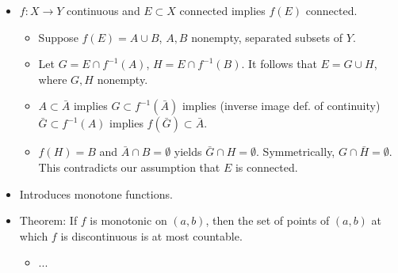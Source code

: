 \documentclass[../../notes.tex]{subfiles}
\begin{document}
\begin{itemize}
\begin{itemize}
        \item ...
    \end{itemize}
    \item {}$f:X\to Y$ continuous and $E\subset X$ connected implies $f(E)$ connected.
    \begin{itemize}
        \item Suppose $f(E)=A\cup B$, $A,B$ nonempty, separated subsets of $Y$.
        \item Let $G=E\cap f^{-1}(A)$, $H=E\cap f^{-1}(B)$. It follows that $E=G\cup H$, where $G,H$ nonempty.
        \item $A\subset\bar{A}$ implies $G\subset f^{-1}(\bar{A})$ implies (inverse image def. of continuity) $\bar{G}\subset f^{-1}(A)$ implies $f(\bar{G})\subset \bar{A}$.
        \item $f(H)=B$ and $\bar{A}\cap B=\emptyset$ yields $\bar{G}\cap H=\emptyset$. Symmetrically, $G\cap\bar{H}=\emptyset$. This contradicts our assumption that $E$ is connected.
    \end{itemize}
    \item Introduces monotone functions.
    \item Theorem: If $f$ is monotonic on $(a,b)$, then the set of points of $(a,b)$ at which $f$ is discontinuous is at most countable.
    \begin{itemize}
        \item ...
    \end{itemize}
\end{itemize}
\end{document}
